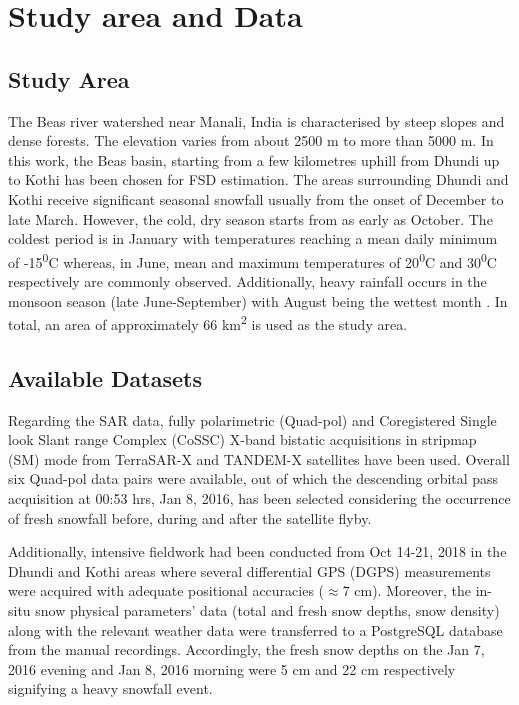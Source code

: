 \documentclass{article}
\begin{document}
\section{Study area and Data}
\label{sec:study}
\subsection{Study Area}
\label{ssec:area}
The Beas river watershed near Manali, India is characterised by steep slopes and dense forests. The elevation varies from about 2500 m to more than 5000 m. In this work, the Beas basin, starting from a few kilometres uphill from Dhundi up to Kothi has been chosen for FSD estimation. The areas surrounding Dhundi and Kothi receive significant seasonal snowfall usually from the onset of December to late March. However, the cold, dry season starts from as early as October. The coldest period is in January with temperatures reaching a mean daily minimum of -15\textsuperscript{0}C whereas, in June, mean and maximum temperatures of 20\textsuperscript{0}C and 30\textsuperscript{0}C respectively are commonly observed. Additionally, heavy rainfall occurs in the monsoon season (late June-September) with August being the wettest month \cite{Thakur2012}. In total, an area of approximately 66 km\textsuperscript{2} is used as the study area.

\subsection{Available Datasets}
\label{ssec:data}
Regarding the SAR data, fully polarimetric (Quad-pol) and Coregistered Single look Slant range Complex (CoSSC) X-band bistatic acquisitions in stripmap (SM) mode from TerraSAR-X and TANDEM-X satellites have been used. Overall six Quad-pol data pairs were available, out of which the descending orbital pass acquisition at 00:53 hrs, Jan 8, 2016, has been selected considering the occurrence of fresh snowfall before, during and after the satellite flyby.

Additionally, intensive fieldwork had been conducted from Oct 14-21, 2018 in the Dhundi and Kothi areas where several differential GPS (DGPS) measurements were acquired with adequate positional accuracies ($\approx$7 cm). Moreover, the in-situ snow physical parameters’ data (total and fresh snow depths, snow density) along with the relevant weather data were transferred to a PostgreSQL database from the manual recordings. Accordingly, the fresh snow depths on the Jan 7, 2016 evening and Jan 8, 2016 morning were 5 cm and 22 cm respectively signifying a heavy snowfall event.
\end{document}
